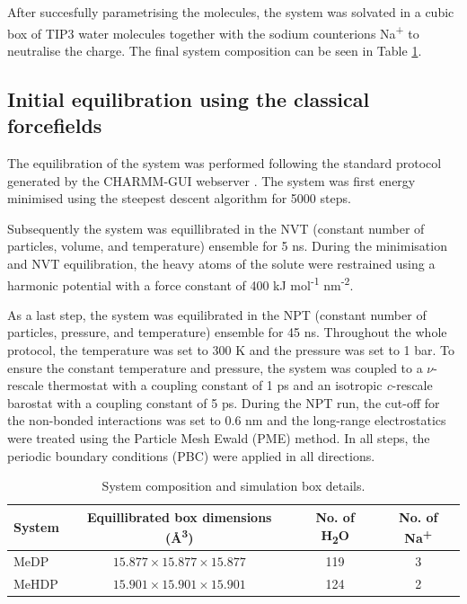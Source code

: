 After succesfully parametrising the molecules, the system was solvated in a cubic box of TIP3 water molecules together with the sodium counterions Na\textsuperscript{+} to neutralise the charge. The final system composition can be seen in Table \ref{tab:system-before-equilibration}.

\subsection{Initial equilibration using the classical forcefields}
The equilibration of the system was performed following the standard protocol generated by the CHARMM-GUI webserver \citep{joCHARMMGUIWebbasedGraphical2008}. The system was first energy minimised using the steepest descent algorithm for 5000 steps. 

Subsequently the system was equillibrated in the NVT (constant number of particles, volume, and temperature) ensemble for 5 ns. During the minimisation and NVT equilibration, the heavy atoms of the solute were restrained using a harmonic potential with a force constant of 400 kJ mol\textsuperscript{-1} nm\textsuperscript{-2}.

As a last step, the system was equilibrated in the NPT (constant number of particles, pressure, and temperature) ensemble for 45 ns. Throughout the whole protocol, the temperature was set to 300 K and the pressure was set to 1 bar. To ensure the constant temperature and pressure, the system was coupled to a $\nu$-rescale thermostat \citep{bussiCanonicalSamplingVelocity2007} with a coupling constant of 1 ps and an isotropic \textit{c}-rescale barostat \citep{bernettiPressureControlUsing2020} with a coupling constant of 5 ps. During the NPT run, the cut-off for the non-bonded interactions was set to 0.6 nm and the long-range electrostatics were treated using the Particle Mesh Ewald (PME) method.  In all steps, the periodic boundary conditions (PBC) were applied in all directions.
\begin{table}[b]
    \centering
    \caption{System composition and simulation box details.}
    \label{tab:system-before-equilibration}
    \begin{tabular}{lccc}
    \toprule
    \textbf{System} & \textbf{Equillibrated box dimensions (\AA\textsuperscript{3})} & \textbf{No. of H\textsubscript{2}O} & \textbf{No. of Na\textsuperscript{+}} \\
    \midrule
    MeDP  & $15.877 \times 15.877 \times 15.877$ & 119 & 3 \\
    MeHDP & $15.901 \times 15.901 \times 15.901$ & 124 & 2 \\
    \bottomrule
    \end{tabular}
\end{table}

